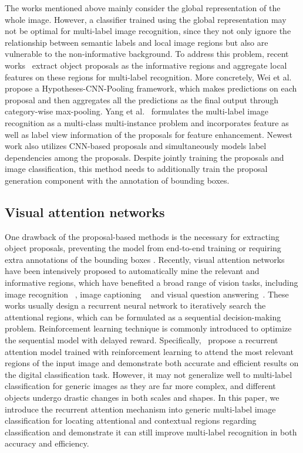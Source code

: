 \documentclass[letterpaper]{article} %
\begin{document}
The works mentioned above mainly consider the global representation of the whole image. However, a classifier trained using the global representation may not be optimal for multi-label image recognition, since they not only ignore the relationship between semantic labels and local image regions but also are vulnerable to the non-informative background. To address this problem, recent works~\cite{yang2016exploit,wei2016hcp} extract object proposals as the informative regions and aggregate local features on these regions for multi-label recognition. More concretely, Wei et al.~\cite{wei2016hcp} propose a Hypotheses-CNN-Pooling framework, which makes predictions on each proposal and then aggregates all the predictions as the final output through category-wise max-pooling. Yang et al.~\cite{yang2016exploit} formulates the multi-label image recognition as a multi-class multi-instance problem and incorporates feature as well as label view information of the proposals for feature enhancement. Newest work \cite{zhang2016multi} also utilizes CNN-based proposals and simultaneously models label dependencies among the proposals. Despite jointly training the proposals and image classification, this method needs to additionally train the proposal generation component with the annotation of bounding boxes. 

\subsection{Visual attention networks}
One drawback of the proposal-based methods is the necessary for extracting object proposals, preventing the model from end-to-end training \cite{wei2016hcp,yang2016exploit} or requiring extra annotations of the bounding boxes \cite{zhang2016multi}. Recently, visual attention networks have been intensively proposed to automatically mine the relevant and informative regions, which have benefited a broad range of vision tasks, including image recognition ~\cite{mnih2014recurrent,ba2014multiple,xiao2015application}, image captioning ~\cite{xu2015show} and visual question answering~\cite{xiong2016dynamic}. These works usually design a recurrent neural network to iteratively search the attentional regions, which can be formulated as a sequential decision-making problem. Reinforcement learning technique is commonly introduced to optimize the sequential model with delayed reward. Specifically,~\cite{mnih2014recurrent,ba2014multiple} propose a recurrent attention model trained with reinforcement learning to attend the most relevant regions of the input image and demonstrate both accurate and efficient results on the digital classification task. However, it may not generalize well to multi-label classification for generic images as they are far more complex, and different objects undergo drastic changes in both scales and shapes. In this paper, we introduce the recurrent attention mechanism into generic multi-label image classification for locating attentional and contextual regions regarding classification and demonstrate it can still improve multi-label recognition in both accuracy and efficiency.
\end{document}
